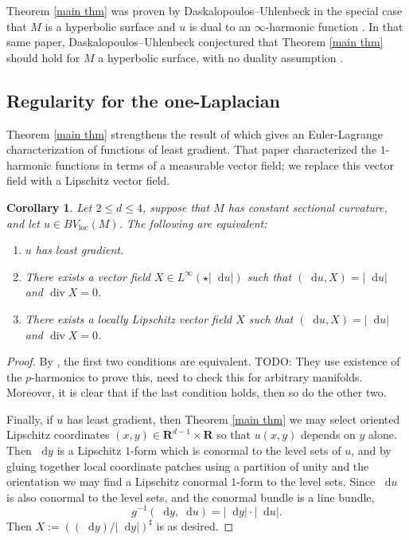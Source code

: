\documentclass[reqno,11pt]{amsart}
\newcommand{\RR}{\mathbf{R}}
\newcommand*\dif{\mathop{}\!\mathrm{d}}
\DeclareMathOperator{\Div}{div}
\newcommand{\loc}{\mathrm{loc}}
\newtheorem{corollary}[theorem]{Corollary}
\theoremstyle{definition}
\numberwithin{equation}{section}
\begin{document}
Theorem \ref{main thm} was proven by Daskalopoulos--Uhlenbeck in the special case that $M$ is a hyperbolic surface and $u$ is dual to an $\infty$-harmonic function \cite[Theorem 5.2, Theorem 6.10]{daskalopoulos2020transverse}.
In that same paper, Daskalopoulos--Uhlenbeck conjectured that Theorem \ref{main thm} should hold for $M$ a hyperbolic surface, with no duality assumption \cite[Problem 9.4, Conjecture 9.5]{daskalopoulos2020transverse}.

\subsection{Regularity for the one-Laplacian}
Theorem \ref{main thm} strengthens the result of \cite{Mazon14} which gives an Euler-Lagrange characterization of functions of least gradient.
That paper characterized the $1$-harmonic functions in terms of a measurable vector field; we replace this vector field with a Lipschitz vector field.

\begin{corollary}
Let $2 \leq d \leq 4$, suppose that $M$ has constant sectional curvature, and let $u \in BV_\loc(M)$. The following are equivalent:
\begin{enumerate}
\item $u$ has least gradient.
\item There exists a vector field $X \in L^\infty(\star |\dif u|)$ such that $(\dif u, X) = |\dif u|$ and $\Div X = 0$.
\item There exists a locally Lipschitz vector field $X$ such that $(\dif u, X) = |\dif u|$ and $\Div X = 0$.
\end{enumerate}
\end{corollary}
\begin{proof}
By \cite{Mazon14}, the first two conditions are equivalent. TODO: They use existence of the $p$-harmonics to prove this, need to check this for arbitrary manifolds.
Moreover, it is clear that if the last condition holds, then so do the other two.

Finally, if $u$ has least gradient, then Theorem \ref{main thm} we may select oriented Lipschitz coordinates $(x, y) \in \RR^{d - 1} \times \RR$ so that $u(x, y)$ depends on $y$ alone.
Then $\dif y$ is a Lipschitz $1$-form which is conormal to the level sets of $u$, and by gluing together local coordinate patches using a partition of unity and the orientation we may find a Lipschitz conormal $1$-form to the level sets.
Since $\dif u$ is also conormal to the level sets, and the conormal bundle is a line bundle,
$$g^{-1}(\dif y, \dif u) = |\dif y| \cdot |\dif u|.$$
Then $X := ((\dif y)/|\dif y|)^\sharp$ is as desired.
\end{proof}
\end{document}
